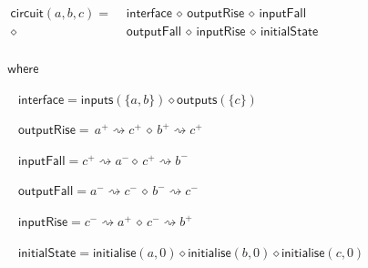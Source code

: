 \documentclass[british,compsoc]{IEEEtran}
\begin{document}
\vspace{2mm}
\begin{minipage}[t]{1\columnwidth}%

\begin{flushleft}
$\begin{aligned}\mathsf{circuit}(a, b, c)=&\,\mathsf{\,interface}\,\diamond \mathsf{\, outputRise}\,\diamond\,\mathsf{inputFall}\,\\
\diamond\, &\,\,\mathsf{outputFall}\,\diamond \mathsf{\, inputRise}\,\diamond\,\mathsf{initialState}\\
\end{aligned}
$

$\,\mathsf{where}$
\par\end{flushleft}

\begin{flushleft}
$\,\,\,\,\,\,\mathsf{interface}=\mathsf{inputs}(\{a,b\})\diamond\mathsf{outputs}(\{c\})$
\par\end{flushleft}

\begin{flushleft}
$\,\,\,\,\,\,\mathsf{outputRise}=\,a^{+}\rightsquigarrow c^{+}\,\diamond\, b^{+}\rightsquigarrow c^{+}$
\par\end{flushleft}

\begin{flushleft}
$\,\,\,\,\,\,\mathsf{inputFall}=c ^ {+} \rightsquigarrow a^{-} \diamond\, c ^ {+} \rightsquigarrow b^{-}$
\par\end{flushleft}

\begin{flushleft}
$\,\,\,\,\,\,\mathsf{outputFall}= a^{-} \rightsquigarrow c^{-} \,\diamond\, b^{-} \rightsquigarrow c^{-}$
\par\end{flushleft}

\begin{flushleft}
$\,\,\,\,\,\,\mathsf{inputRise}=c^{-} \rightsquigarrow a^{+} \,\diamond\, c^{-} \rightsquigarrow b^{+}$
\par\end{flushleft}

\begin{flushleft}
$\,\,\,\,\,\,\mathsf{initialState}=\mathsf{initialise}(a,0) \diamond \mathsf{initialise}(b,0) \diamond \mathsf{initialise}(c,0)$
\par\end{flushleft}

\end{minipage}
\end{document}
